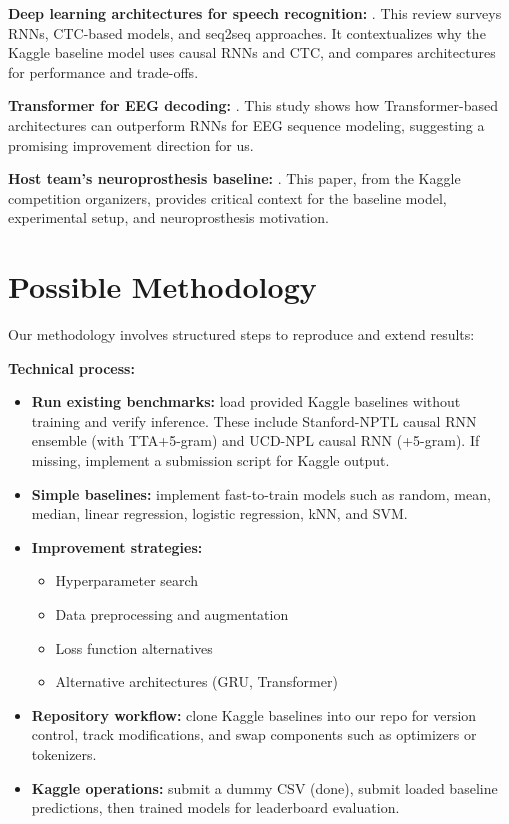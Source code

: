 \documentclass[10pt,twocolumn,letterpaper]{article}
\begin{document}
\textbf{Deep learning architectures for speech recognition:} \cite{papastratis_speech_2021}.  
This review surveys RNNs, CTC-based models, and seq2seq approaches. It contextualizes why the Kaggle baseline model uses causal RNNs and CTC, and compares architectures for performance and trade-offs.

\textbf{Transformer for EEG decoding:} \cite{lee_eeg-transformer_2021}.  
This study shows how Transformer-based architectures can outperform RNNs for EEG sequence modeling, suggesting a promising improvement direction for us.

\textbf{Host team’s neuroprosthesis baseline:} \cite{card_accurate_2024}.  
This paper, from the Kaggle competition organizers, provides critical context for the baseline model, experimental setup, and neuroprosthesis motivation.

\section{Possible Methodology}
Our methodology involves structured steps to reproduce and extend results:

\textbf{Technical process:}
\begin{itemize}
    \item \textbf{Run existing benchmarks:} load provided Kaggle baselines without training and verify inference. These include Stanford-NPTL causal RNN ensemble (with TTA+5-gram) and UCD-NPL causal RNN (+5-gram). If missing, implement a submission script for Kaggle output.
    \item \textbf{Simple baselines:} implement fast-to-train models such as random, mean, median, linear regression, logistic regression, kNN, and SVM.
    \item \textbf{Improvement strategies:} 
    \begin{itemize}
        \item Hyperparameter search
        \item Data preprocessing and augmentation
        \item Loss function alternatives
        \item Alternative architectures (GRU, Transformer)
    \end{itemize}
    \item \textbf{Repository workflow:} clone Kaggle baselines into our repo for version control, track modifications, and swap components such as optimizers or tokenizers.
    \item \textbf{Kaggle operations:} submit a dummy CSV (done), submit loaded baseline predictions, then trained models for leaderboard evaluation.
\end{itemize}
\end{document}
